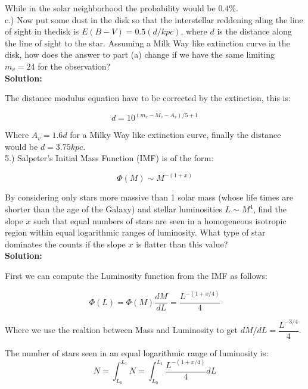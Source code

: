 \documentclass[14pt]{article}
\begin{document}
While in the solar neighborhood the probability would be $0.4 \%$.\\

c.) Now put some dust in the disk so that the interstellar reddening
aling the line of sight in thedisk is $E(B-V)=0.5(d/kpc)$, where $d$
is the distance along the line of sight to the star. Assuming a Milk
Way like extinction curve in the disk, how does the answer to part
(a) change if we have the same limiting $m_v=24$ for the
observation?\\

\textbf{Solution:}

The distance modulus equation have to be corrected by the extinction,
this is:

\begin{equation}
d = 10^{(m_v-M_v-A_v)/5 + 1}
\end{equation}

Where $A_v=1.6d$ for a Milky Way like extinction curve, finally the
distance would be $d=3.75kpc$.\\

5.) Salpeter's Initial Mass Function (IMF) is of the form:

\begin{equation}
\Phi(M) \sim M^{-(1+x)}
\end{equation}

By considering only stars more massive than 1 solar mass (whose life
times are shorter than the age of the Galaxy) and stellar luminosities
$L\sim M^4$, find the slope $x$ such that equal numbers of stars are
seen in a homogeneous isotropic region within equal logarithmic ranges
of luminosity. What type of star dominates the counts if the slope $x$
is flatter than this value? \\

\textbf{Solution:}

First we can compute the Luminosity function from the IMF as follows:

\begin{equation}
\Phi(L) = \Phi(M)\dfrac{dM}{dL} = \dfrac{L^{-(1+x/4)}}{4}
\end{equation}

Where we use the realtion between Mass and Luminosity to get $dM/dL =
\dfrac{L^{-3/4}}{4}$.

The number of stars seen in an equal logarithmic range of luminosity
is:\\

\begin{equation}
N = \int_{L_0}^{L_1} N= \int_{L_0}^{L_1} \dfrac{L^{-(1+x/4)}}{4} dL
\end{equation}
\end{document}
